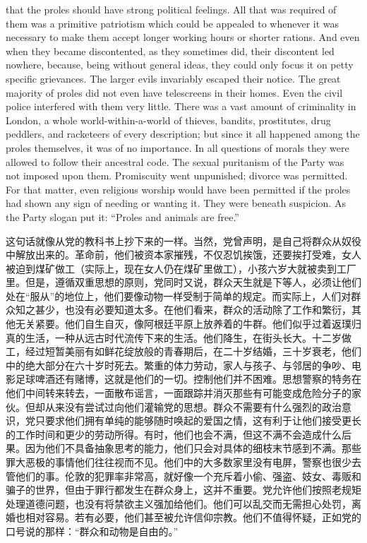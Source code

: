 \begin{paracol}{2}
that the proles should have strong political feelings. All that was
required of them was a primitive patriotism which could be appealed to
whenever it was necessary to make them accept longer working hours or
shorter rations. And even when they became discontented, as they
sometimes did, their discontent led nowhere, because, being without
general ideas, they could only focus it on petty specific grievances.
The larger evils invariably escaped their notice. The great majority of
proles did not even have telescreens in their homes. Even the civil
police interfered with them very little. There was a vast amount of
criminality in London, a whole world-within-a-world of thieves, bandits,
prostitutes, drug peddlers, and racketeers of every description; but
since it all happened among the proles themselves, it was of no
importance. In all questions of morals they were allowed to follow their
ancestral code. The sexual puritanism of the Party was not imposed upon
them. Promiscuity went unpunished; divorce was permitted. For that
matter, even religious worship would have been permitted if the proles
had shown any sign of needing or wanting it. They were beneath
suspicion. As the Party slogan put it: ``Proles and animals are free.''

\switchcolumn

这句话就像从党的教科书上抄下来的一样。当然，党曾声明，是自己将群众从奴役中解放出来的。革命前，他们被资本家摧残，不仅忍饥挨饿，还要挨打受难，女人被迫到煤矿做工（实际上，现在女人仍在煤矿里做工），小孩六岁大就被卖到工厂里。但是，遵循双重思想的原则，党同时又说，群众天生就是下等人，必须让他们处在``服从''的地位上，他们要像动物一样受制于简单的规定。而实际上，人们对群众知之甚少，也没有必要知道太多。在他们看来，群众的活动除了工作和繁衍，其他无关紧要。他们自生自灭，像阿根廷平原上放养着的牛群。他们似乎过着返璞归真的生活，一种从远古时代流传下来的生活。他们降生，在街头长大。十二岁做工，经过短暂美丽有如鲜花绽放般的青春期后，在二十岁结婚，三十岁衰老，他们中的绝大部分在六十岁时死去。繁重的体力劳动，家人与孩子、与邻居的争吵、电影足球啤酒还有赌博，这就是他们的一切。控制他们并不困难。思想警察的特务在他们中间转来转去，一面散布谣言，一面跟踪并消灭那些有可能变成危险分子的家伙。但却从来没有尝试过向他们灌输党的思想。群众不需要有什么强烈的政治意识，党只要求他们拥有单纯的能够随时唤起的爱国之情，这有利于让他们接受更长的工作时间和更少的劳动所得。有时，他们也会不满，但这不满不会造成什么后果。因为他们不具备抽象思考的能力，他们只会对具体的细枝末节感到不满。那些罪大恶极的事情他们往往视而不见。他们中的大多数家里没有电屏，警察也很少去管他们的事。伦敦的犯罪率非常高，就好像一个充斥着小偷、强盗、妓女、毒贩和骗子的世界，但由于罪行都发生在群众身上，这并不重要。党允许他们按照老规矩处理道德问题，也没有将禁欲主义强加给他们。他们可以乱交而无需担心处罚，离婚也相对容易。若有必要，他们甚至被允许信仰宗教。他们不值得怀疑，正如党的口号说的那样：``群众和动物是自由的。''


\end{paracol}
